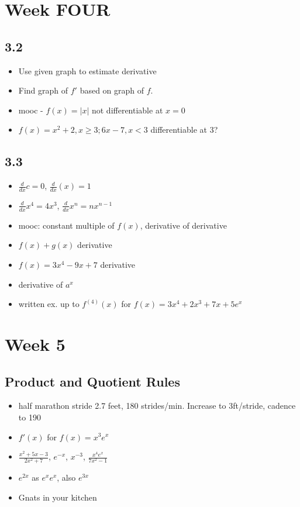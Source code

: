 \documentclass[11pt]{article}
\begin{document}
\section{Week FOUR}

\subsection{3.2}
\begin{itemize}
	\item Use given graph to estimate derivative
	\item Find graph of $f'$ based on graph of $f$.
	\item mooc - $f(x) = \vert x \vert$ not differentiable at $x = 0$
	\item $f(x) = x^2 + 2, x \geq 3; 6x-7, x < 3$ differentiable at 3?
\end{itemize}

\subsection{3.3}
\begin{itemize}
	\item $\frac{d}{dx} c = 0$, $\frac{d}{dx} (x) = 1$
	\item $\frac{d}{dx} x^4 = 4x^3$, $\frac{d}{dx} x^n = nx^{n-1}$
	\item mooc: constant multiple of $f(x)$, derivative of derivative
	\item $f(x) + g(x)$ derivative
	\item $f(x) = 3x^4 - 9x + 7$ derivative
	\item derivative of $a^x$
	\item written ex. up to $f^{(4)}(x)$ for $f(x) = 3x^4 + 2x^3 + 7x + 5e^x$
\end{itemize}




\section*{Week 5}

\subsection{Product and Quotient Rules}
\begin{itemize}
	\item half marathon stride 2.7 feet, 180 strides/min.  Increase to 3ft/stride, cadence to 190
	\item $f'(x)$ for $f(x) = x^3e^x$
	\item $\frac{x^2 + 5x - 3}{2x^2 + 7}$, $e^{-x}$, $x^{-3}$, $\frac{x^4e^x}{7x^2 -1 }$
	\item $e^{2x}$ as $e^x e^x$, also $e^{3x}$
	\item Gnats in your kitchen
\end{itemize}
\end{document}

